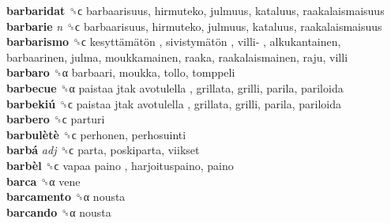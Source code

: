 \textbf{barbaridat} ␝ϲ  barbaarisuus, hirmuteko, julmuus, kataluus, raakalaismaisuus  \\
\textbf{barbarie} \emph{n}  ␝ϲ  barbaarisuus, hirmuteko, julmuus, kataluus, raakalaismaisuus  \\
\textbf{barbarismo} ␝ϲ   kesyttämätön ,  sivistymätön ,  villi- , alkukantainen, barbaarinen, julma, moukkamainen, raaka, raakalaismainen, raju, villi  \\
\textbf{barbaro} ␝α  barbaari, moukka, tollo, tomppeli  \\
\textbf{barbecue} ␝α   paistaa jtak avotulella , grillata, grilli, parila, pariloida  \\
\textbf{barbekiú} ␝ϲ   paistaa jtak avotulella , grillata, grilli, parila, pariloida  \\
\textbf{barbero} ␝ϲ  parturi  \\
\textbf{barbulètè} ␝ϲ  perhonen, perhosuinti  \\
\textbf{barbá} \emph{adj}  ␝ϲ  parta, poskiparta, viikset  \\
\textbf{barbèl} ␝ϲ   vapaa paino , harjoituspaino, paino  \\
\textbf{barca} ␝α  vene  \\
\textbf{barcamento} ␝α  nousta  \\
\textbf{barcando} ␝α  nousta  \\
